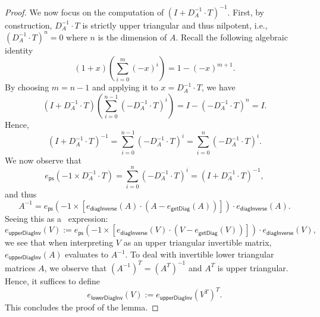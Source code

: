\begin{proof}
    We now focus on the computation of $\left( I+D_A^{-1}\cdot T\right)^{-1}$. First, by construction, $D_A^{-1}\cdot T$ is strictly upper triangular and thus nilpotent, i.e.,   $\left( D_A^{-1}\cdot T\right)^n=0$  where $n$ is the dimension of $A$.
    Recall the following algebraic identity 
    $$(1+x)\left( \sum_{i=0}^{m}(-x)^i \right)=1-(-x)^{m+1}.$$
    By choosing $m=n-1$ and applying it to $x=D_A^{-1}\cdot T$, we have
    $$
    \left(I+D_A^{-1}\cdot T \right)\left( \sum_{i=0}^{n-1}(-D_A^{-1}\cdot T)^i \right)=I- \left( -D_A^{-1}\cdot T\right)^n =I.
    $$
    Hence,
    $$
    \left(I+D_A^{-1}\cdot T \right)^{-1}=\sum_{i=0}^{n-1}(-D_A^{-1}\cdot T)^i=\sum_{i=0}^{n}(-D_A^{-1}\cdot T)^i.
    $$
    We now observe that
    $$
    e_{\mathsf{ps}}(-1\times D_A^{-1}\cdot T)=\sum_{i=0}^{n}(-D_A^{-1}\cdot T)^i=\left(I+D_A^{-1}\cdot T \right)^{-1},
    $$
    and thus 
    $$
    A^{-1}= e_{\mathsf{ps}}\left(-1\times \left[e_{\mathsf{diagInverse}}(A)\cdot(A-e_{\mathsf{getDiag}}(A))\right] \right)\cdot e_{\mathsf{diagInverse}}(A).
    $$
    Seeing this as a \langfor\ expression:
    $$
    e_{\mathsf{upperDiagInv}}(V):= e_{\mathsf{ps}}\left(-1\times \left[e_{\mathsf{diagInverse}}(V)\cdot(V-e_{\mathsf{getDiag}}(V))\right] \right)\cdot e_{\mathsf{diagInverse}}(V),
    $$
    we see that  when interpreting $V$ as an  upper triangular invertible matrix, 
    $e_{\mathsf{upperDiagInv}}(A)$ evaluates to $A^{-1}$.
   To deal with invertible lower triangular matrices $A$, we observe that  $\left(A^{-1}\right)^T=\left(A^T\right)^{-1}$ and $A^T$ is upper triangular.
    Hence, it suffices to define
    $$
    e_{\mathsf{lowerDiagInv}}(V):= e_{\mathsf{upperDiagInv}}(V^T)^T.
    $$
    This concludes the proof of the lemma.
\end{proof}

